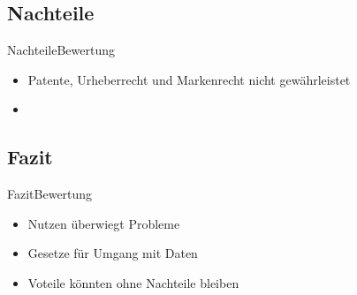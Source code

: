 \documentclass[10pt,a4paper]{beamer}
\begin{document}
\subsection{Nachteile}
\begin{frame}{Nachteile}{Bewertung}
\begin{itemize}
\item Patente, Urheberrecht und Markenrecht nicht gewährleistet
\item 
\end{itemize}
\end{frame}

\subsection{Fazit}
\begin{frame}{Fazit}{Bewertung}
\begin{itemize}
\item Nutzen überwiegt Probleme \pause
\item Gesetze für Umgang mit Daten \pause
\item Voteile könnten ohne Nachteile bleiben
\end{itemize}
\end{frame}
\end{document}
